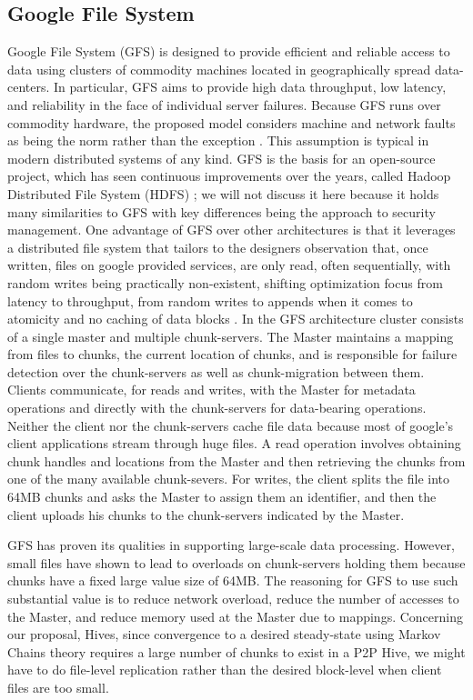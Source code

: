 \documentclass[runningheads]{llncs}
\begin{document}
\subsection{Google File System}
Google File System (GFS) \cite{gfs} is designed to provide efficient and reliable access to data using clusters of commodity machines located in geographically spread data-centers. In particular, GFS aims to provide high data throughput, low latency, and reliability in the face of individual server failures. Because GFS runs over commodity hardware, the proposed model considers machine and network faults as being the norm rather than the exception \cite{gfs}.  This assumption is typical in modern distributed systems of any kind. GFS is the basis for an open-source project, which has seen continuous improvements over the years, called Hadoop Distributed File System (HDFS) \cite{hadoop}; we will not discuss it here because it holds many similarities to GFS with key differences being the approach to security management. One advantage of GFS over other architectures is that it leverages a distributed file system that tailors to the designers observation that, once written, files on google provided services, are only read, often sequentially, with random writes being practically non-existent, shifting optimization focus from latency to throughput, from random writes to appends when it comes to atomicity and no caching of data blocks \cite{gfs}. In the GFS architecture cluster consists of a single master and multiple chunk-servers. The Master maintains a mapping from files to chunks, the current location of chunks, and is responsible for failure detection over the chunk-servers as well as chunk-migration between them. Clients communicate, for reads and writes, with the Master for metadata operations and directly with the chunk-servers for data-bearing operations. Neither the client nor the chunk-servers cache file data because most of google's client applications stream through huge files. A read operation involves obtaining chunk handles and locations from the Master and then retrieving the chunks from one of the many available chunk-severs. For writes, the client splits the file into 64MB chunks and asks the Master to assign them an identifier, and then the client uploads his chunks to the chunk-servers indicated by the Master.

GFS has proven its qualities in supporting large-scale data processing. However, small files have shown \cite{gfs} to lead to overloads on chunk-servers holding them because chunks have a fixed large value size of 64MB. The reasoning for GFS to use such substantial value is to reduce network overload, reduce the number of accesses to the Master, and reduce memory used at the Master due to mappings. Concerning our proposal, Hives, since convergence to a desired steady-state using Markov Chains theory requires a large number of chunks to exist in a P2P Hive, we might have to do file-level replication rather than the desired block-level when client files are too small.\newline
\end{document}
